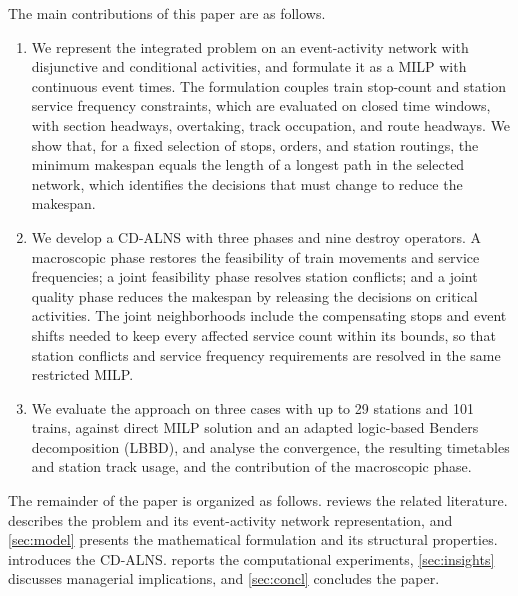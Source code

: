 The main contributions of this paper are as follows.
\begin{enumerate}
\item We represent the integrated problem on an event-activity network with disjunctive and conditional activities, and formulate it as a MILP with continuous event times. The formulation couples train stop-count and station service frequency constraints, which are evaluated on closed time windows, with section headways, overtaking, track occupation, and route headways. We show that, for a fixed selection of stops, orders, and station routings, the minimum makespan equals the length of a longest path in the selected network, which identifies the decisions that must change to reduce the makespan.
\item We develop a CD-ALNS with three phases and nine destroy operators. A macroscopic phase restores the feasibility of train movements and service frequencies; a joint feasibility phase resolves station conflicts; and a joint quality phase reduces the makespan by releasing the decisions on critical activities. The joint neighborhoods include the compensating stops and event shifts needed to keep every affected service count within its bounds, so that station conflicts and service frequency requirements are resolved in the same restricted MILP.
\item We evaluate the approach on three cases with up to 29 stations and 101 trains, against direct MILP solution and an adapted logic-based Benders decomposition (LBBD), and analyse the convergence, the resulting timetables and station track usage, and the contribution of the macroscopic phase.
\end{enumerate}

The remainder of the paper is organized as follows.  reviews the related literature.  describes the problem and its event-activity network representation, and \cref{sec:model} presents the mathematical formulation and its structural properties.  introduces the CD-ALNS.  reports the computational experiments, \cref{sec:insights} discusses managerial implications, and \cref{sec:concl} concludes the paper.
